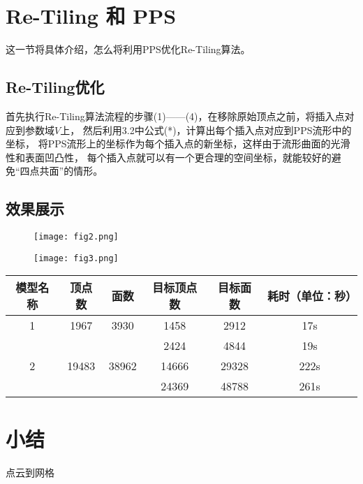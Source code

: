 \documentclass[lang=cn,11pt,a4paper,cite=authoryear]{elegantpaper}
\begin{document}
\section{Re-Tiling 和 PPS}

这一节将具体介绍，怎么将利用PPS优化Re-Tiling算法。

\subsection{Re-Tiling优化}
首先执行Re-Tiling算法流程的步骤(1)——(4)，在移除原始顶点之前，将插入点对应到参数域$V$上，
然后利用3.2中公式(*)，计算出每个插入点对应到PPS流形中的坐标，
将PPS流形上的坐标作为每个插入点的新坐标，这样由于流形曲面的光滑性和表面凹凸性，
每个插入点就可以有一个更合理的空间坐标，就能较好的避免“四点共面”的情形。

\subsection{效果展示}

\begin{figure}[!htb]
\centering
\texttt{[image: fig2.png]}
\caption{}
\end{figure}

\begin{figure}[!htb]
\centering
\texttt{[image: fig3.png]}
\caption{}
\end{figure}


\begin{center}
\begin{tabular}{cccccc}
\toprule  %
模型名称& 顶点数& 面数& 目标顶点数& 目标面数& 耗时（单位：秒）\\
\midrule  %
1&	1967&	3930&	   1458&	2912&	17s\\
 &      &     &    2424&	4844&	19s\\

\midrule %
2& 19483&  38962&  14666&	  29328&	  222s\\
 &	     &	    &	24369&	48788&	261s\\

\bottomrule %
\end{tabular}
\end{center}




\section{小结}
点云到网格
\end{document}
